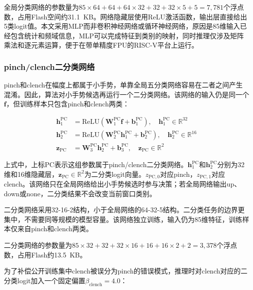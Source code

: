 \documentclass[lettersize,journal]{IEEEtran}
\begin{document}
全局分类网络的参数量为$85 \times 64 + 64 + 64 \times 32 + 32 + 32 \times 5 + 5 = 7,781$个浮点数，占用Flash空间约31.1~KB。网络隐藏层使用ReLU激活函数，输出层直接给出5类logit值。本文采用MLP而非卷积神经网络或循环神经网络，原因是85维输入已经包含统计和频域信息，MLP可以完成特征到类别的映射，同时推理仅涉及矩阵乘法和逐元素运算，便于在带单精度FPU的RISC-V平台上运行。

\subsubsection{pinch/clench二分类网络}

pinch和clench在幅度上都属于小手势，单靠全局五分类网络容易在二者之间产生混淆。因此，算法对小手势候选再运行一个二分类网络。该网络的输入仍是同一个$\mathbf{f}$，但训练样本只包含pinch和clench两类：

\begin{equation}
    \begin{aligned}
        \mathbf{h}_1^\mathrm{PC} &= \mathrm{ReLU}(\mathbf{W}_1^\mathrm{PC} \mathbf{f} + \mathbf{b}_1^\mathrm{PC}), \quad \mathbf{h}_1^\mathrm{PC} \in \mathbb{R}^{32} \\
        \mathbf{h}_2^\mathrm{PC} &= \mathrm{ReLU}(\mathbf{W}_2^\mathrm{PC} \mathbf{h}_1^\mathrm{PC} + \mathbf{b}_2^\mathrm{PC}), \quad \mathbf{h}_2^\mathrm{PC} \in \mathbb{R}^{16} \\
        \mathbf{z}_\mathrm{PC} &= \mathbf{W}_3^\mathrm{PC} \mathbf{h}_2^\mathrm{PC} + \mathbf{b}_3^\mathrm{PC}, \quad \mathbf{z}_\mathrm{PC} \in \mathbb{R}^{2}
    \end{aligned}
\end{equation}

上式中，上标$\mathrm{PC}$表示这组参数属于pinch/clench二分类网络。$\mathbf{h}_1^\mathrm{PC}$和$\mathbf{h}_2^\mathrm{PC}$分别为32维和16维隐藏层，$\mathbf{z}_\mathrm{PC}\in\mathbb{R}^{2}$为二分类logit向量。$z_{\mathrm{PC},0}$对应pinch，$z_{\mathrm{PC},1}$对应clench。该网络只在全局网络给出小手势候选时参与决策；若全局网络输出up、down或none，二分类结果不会改变当前窗口类别。

二分类网络采用32-16-2结构，小于全局网络的64-32-5结构。二分类任务的边界更集中，不需要同等规模的模型容量。该网络独立训练，输入仍为85维特征，训练样本仅来自pinch和clench两类。

二分类网络的参数量为$85 \times 32 + 32 + 32 \times 16 + 16 + 16 \times 2 + 2 = 3,378$个浮点数，占用Flash约13.5~KB。

为了补偿公开训练集中clench被误分为pinch的错误模式，推理时对clench对应的二分类logit加入一个固定偏置$\beta_\mathrm{clench}=4.0$：
\end{document}
